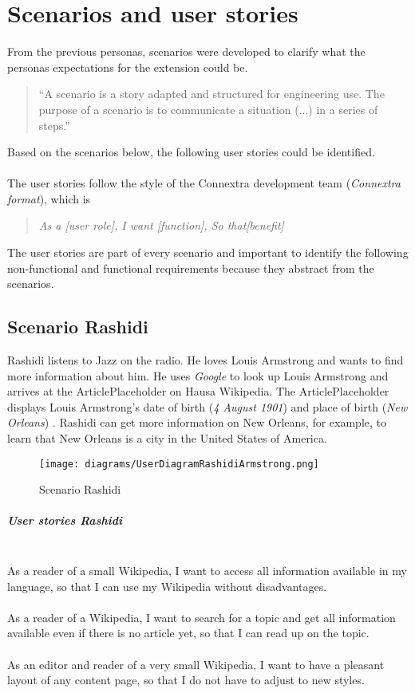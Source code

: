 \chapter{Scenarios and user stories}

From the previous personas, scenarios were developed to clarify what the personas expectations for the extension could be.
\begin{quote}
``A scenario is a story adapted and structured for engineering use. The purpose of a scenario is to communicate a situation (...) in a series of steps.'' \citep[98]{scenario} 
\end{quote}
Based on the scenarios below, the following user stories could be identified. \\
\\
The user stories follow the style of the Connextra development team (\textit{Connextra format}), which is
\begin{quote}
\textit{As a [user role], \newline I want [function], \newline So that[benefit]}
\end{quote} 
\citep{connextrastory,userstory}
The user stories are part of every scenario and important to identify the following non-functional and functional requirements because they abstract from the scenarios. 

\section{Scenario Rashidi}
Rashidi listens to Jazz on the radio. He loves Louis Armstrong and wants to find more information about him. He uses \textit{Google} to look up Louis Armstrong and arrives at the ArticlePlaceholder on Hausa Wikipedia. The ArticlePlaceholder displays Louis Armstrong's date of birth (\textit{4 August 1901}) and place of birth (\textit{New Orleans}) \citep{wd:03}. Rashidi can get more information on New Orleans, for example, to learn that New Orleans is a city in the United States of America. 
\begin{figure}[H]
	\centering
	\texttt{[image: diagrams/UserDiagramRashidiArmstrong.png]}
	\caption{Scenario Rashidi}
	\label{fig:ScenarioRashidi}
\end{figure}

\paragraph{User stories Rashidi} ~\\
As a reader of a small Wikipedia, I want to access all information available in my language, so that I can use my Wikipedia without disadvantages. \\
\\
As a reader of a Wikipedia, I want to search for a topic and get all information available even if there is no article yet, so that I can read up on the topic. \\
\\
As an editor and reader of a very small Wikipedia, I want to have a pleasant layout of any content page, so that I do not have to adjust to new styles.


